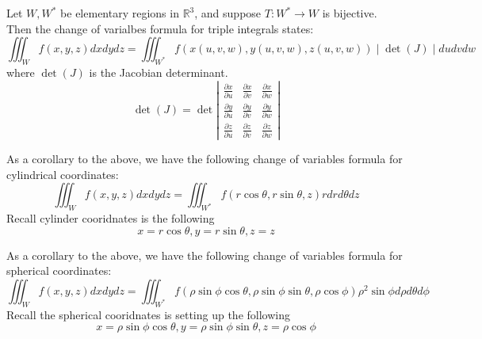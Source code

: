 \documentclass[openany]{book}
\newcommand{\R}{\mathbb{R}}
\begin{document}
\begin{prop}
    Let $W,W^*$ be elementary regions in $\R^3$, and suppose $T:W^*\to W$ is bijective. Then the change of varialbes formula for triple integrals states:
    \begin{equation*}
        \iiint_Wf(x,y,z)dxdydz=\iiint_{W^*}f(x(u,v,w), y(u,v,w), z(u,v,w))\mid\det(J)\mid dudvdw
    \end{equation*}
    where $\det(J)$ is the Jacobian determinant.
    \begin{equation*}
        \det(J)=\det\left|\begin{matrix}
            \frac{\partial x}{\partial u}&\frac{\partial x}{\partial v}&\frac{\partial x}{\partial w}\\
            \frac{\partial y}{\partial u}&\frac{\partial y}{\partial v}&\frac{\partial y}{\partial w}\\
            \frac{\partial z}{\partial u}&\frac{\partial z}{\partial v}&\frac{\partial z}{\partial w}
        \end{matrix}\right|
    \end{equation*}
\end{prop}


\begin{prop}
    As a corollary to the above, we have the following change of variables formula for cylindrical coordinates:
    \begin{equation*}
        \iiint_Wf(x,y,z)dxdydz=\iiint_{W^*}f(r\cos\theta, r\sin\theta, z)rdrd\theta dz
    \end{equation*}
    Recall cylinder cooridnates is the following 
    \begin{equation*}
        x=r\cos\theta, y=r\sin\theta, z=z
    \end{equation*}
\end{prop}

\begin{prop}
    As a corollary to the above, we have the following change of variables formula for spherical coordinates:
    \begin{equation*}
        \iiint_Wf(x,y,z)dxdydz=\iiint_{W^*}f(\rho\sin\phi\cos\theta, \rho\sin\phi\sin\theta, \rho\cos\phi)\rho^2\sin\phi d\rho d\theta d\phi
    \end{equation*}
    Recall the spherical cooridnates is setting up the following 
    \begin{equation*}
        x=\rho\sin\phi\cos\theta, y=\rho\sin\phi\sin\theta, z=\rho\cos\phi
    \end{equation*}
\end{prop}
\end{document}
